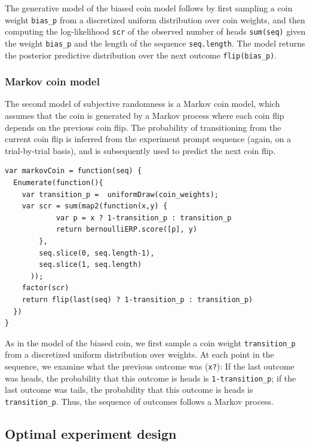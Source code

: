 \documentclass{article}
\begin{document}
The generative model of the biased coin model follows by first sampling a coin weight \lstinline{bias_p} from a discretized uniform distribution over coin weights, and then computing the log-likelihood \lstinline{scr} of the observed number of heads \lstinline{sum(seq)} given the weight \lstinline{bias_p} and the length of the sequence \lstinline{seq.length}. The model returns the posterior predictive distribution over the next outcome \lstinline{flip(bias_p)}.



\subsubsection{Markov coin model}
\label{s:tutorial:sss:markov}
The second model of subjective randomness is a Markov coin model, which assumes that the coin is generated by a Markov process where each coin flip depends on the previous coin flip. The probability of transitioning from the current coin flip is inferred from the experiment prompt sequence (again, on a trial-by-trial basis), and is subsequently used to predict the next coin flip.

\begin{lstlisting}[caption=Markov coin model]
var markovCoin = function(seq) {
  Enumerate(function(){
    var transition_p =  uniformDraw(coin_weights);
    var scr = sum(map2(function(x,y) {
    		var p = x ? 1-transition_p : transition_p
     	 	return bernoulliERP.score([p], y)
    	},
    	seq.slice(0, seq.length-1),
    	seq.slice(1, seq.length)
	  ));
    factor(scr)
    return flip(last(seq) ? 1-transition_p : transition_p)
  })
}
\end{lstlisting}

As in the model of the biased coin, we first sample a coin weight \lstinline{transition_p} from a discretized uniform distribution over weights. At each point in the sequence, we examine what the previous outcome was (\lstinline{x?}): If the last outcome was heads, the probability that this outcome is heads is \lstinline{1-transition_p}; if the last outcome was tails, the probability that this outcome is heads is \lstinline{transition_p}. Thus, the sequence of outcomes follows a Markov process.

\subsection{Optimal experiment design}
\end{document}
